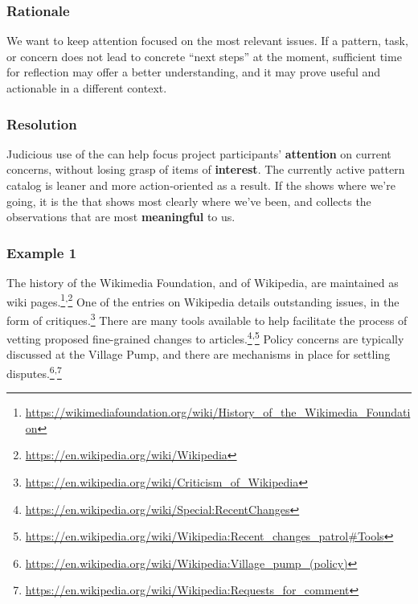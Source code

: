 \subsubsection*{Rationale} 
We want to keep attention focused on the most relevant issues.  If a
pattern, task, or concern does not lead to concrete ``next steps'' at
the moment, sufficient time for reflection may offer a better
understanding, and it may prove useful and actionable in a different
context.

\subsubsection*{Resolution} 
Judicious use of the  can help focus project participants' \textbf{attention} on current concerns, without losing grasp of items of \textbf{interest}.  The currently active pattern catalog is leaner and more action-oriented as a result. If the  shows where we're going, it is the  that shows most clearly where we've been, and collects the observations that are most \textbf{meaningful} to us.

\subsubsection*{Example 1} 
The history of the Wikimedia Foundation, and of Wiki\-pedia, are
maintained as wiki
pages.\footnote{\url{https://wikimediafoundation.org/wiki/History_of_the_Wikimedia_Foundation}}\textsuperscript{,}\footnote{\url{https://en.wikipedia.org/wiki/Wikipedia}}
One of the entries on Wikipedia details outstanding issues, in the
form of
critiques.\footnote{\url{https://en.wikipedia.org/wiki/Criticism_of_Wikipedia}}
There are many tools available 
to help facilitate the process of
vetting proposed fine-grained changes to
articles.\footnote{\url{https://en.wikipedia.org/wiki/Special:RecentChanges}}\textsuperscript{,}\footnote{\url{https://en.wikipedia.org/wiki/Wikipedia:Recent_changes_patrol\#Tools}}
Policy concerns are typically discussed at the Village Pump, and 
there are mechanisms in place for settling
disputes.\footnote{\url{https://en.wikipedia.org/wiki/Wikipedia:Village_pump_(policy)}}\textsuperscript{,}\footnote{\url{https://en.wikipedia.org/wiki/Wikipedia:Requests_for_comment}}

